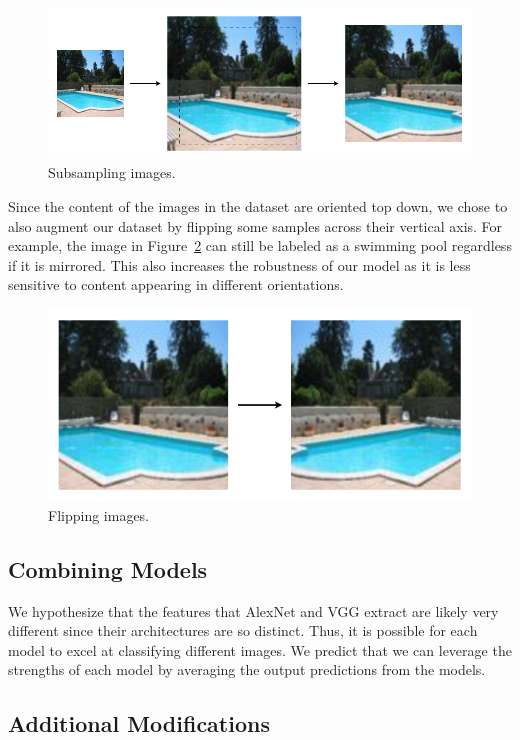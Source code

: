 \documentclass[10pt,twocolumn,letterpaper]{article}
\begin{document}
\begin{figure}[ht]
\centering
\includegraphics[width=\linewidth]{imgs/sample.png}
\caption{Subsampling images.}
\label{fig:sample}
\end{figure}

Since the content of the images in the dataset are oriented top down, we chose to also augment our dataset by flipping some samples across their vertical axis. For example, the image in Figure~\ref{fig:flip} can still be labeled as a swimming pool regardless if it is mirrored. This also increases the robustness of our model as it is less sensitive to content appearing in different orientations.

\begin{figure}[ht]
\centering
\includegraphics[width=.7\linewidth]{imgs/flip.png}
\caption{Flipping images.}
\label{fig:flip}
\end{figure}

\subsection{Combining Models}\label{sec:combining}

We hypothesize that the features that AlexNet and VGG extract are likely very different since their architectures are so distinct. Thus, it is possible for each model to excel at classifying different images. We predict that we can leverage the strengths of each model by averaging the output predictions from the models.

\subsection{Additional Modifications}\label{sec:additional}
\end{document}
